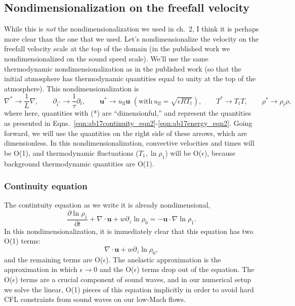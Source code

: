 \documentclass[aps, pre, onecolumn, nofootinbib, notitlepage, groupedaddress, amsfonts, amssymb, amsmath, longbibliography, superscriptaddress]{revtex4-1}
\newcommand{\grad}{\ensuremath{\nabla}}
\begin{document}
\subsection{Nondimensionalization on the freefall velocity}
While this is \emph{not} the nondimensionalization we used in ch.~2, I think it is perhaps more clear than the one that we used.
Let's nondimensionalize the velocity on the freefall velocity scale at the top of the domain (in the published work we nondimensionalized on the sound speed scale).
We'll use the same thermodynamic nondimensionalization as in the published work (so that the initial atmosphere has thermodynamic quantities equal to unity at the top of the atmosphere).
This nondimensionalization is
$$
\grad^* \rightarrow \frac{1}{L}\grad,\qquad
\partial_{t^*} \rightarrow \frac{1}{\tau}\partial_t, \qquad
\bm{u}^* \rightarrow u_{\text{ff}}\bm{u}\,\,(\text{with}\, u_{\text{ff}} = \sqrt{\epsilon R T_t}), \qquad
T^* \rightarrow T_t T,\qquad
\rho^* \rightarrow \rho_t \rho,
$$
where here, quantities with (*) are ``dimensionful,'' and represent the quantities as presented in Eqns.~\ref{eqn:ab17continuity_eqn2}-\ref{eqn:ab17energy_eqn2}.
Going forward, we will use the quantities on the right side of these arrows, which are dimensionless.
In this nondimensionalization, convective velocities and times will be O(1), and thermodynamic fluctuations ($T_1, \ln\rho_1$) will be O($\epsilon$), because background thermodynamic quantities are O(1).

\subsubsection{Continuity equation}
The contintuity equation as we write it is already nondimensional,
\begin{equation}
\frac{\partial \ln\rho_1}{\partial t} + \grad\cdot\bm{u} + w\partial_z \ln\rho_0 = -\bm{u}\cdot\grad\ln\rho_1.
\end{equation}
In this nondimensionalization, it is immediately clear that this equation has two O(1) terms:
$$
\grad\cdot\bm{u} + w\partial_z \ln\rho_0,
$$
and the remaining terms are O($\epsilon$).
The anelastic approximation is the approximation in which $\epsilon \rightarrow 0$ and the O($\epsilon$) terms drop out of the equation.
The O($\epsilon$) terms are a crucial component of sound waves, and in our numerical setup we solve the linear, O(1) pieces of this equation implicitly in order to avoid hard CFL constraints from sound waves on our low-Mach flows.
\end{document}

